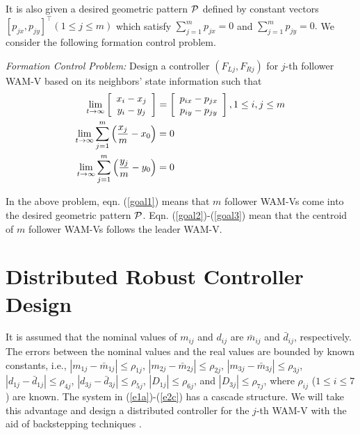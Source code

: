\documentclass[letterpaper, 10 pt, conference]{ieeeconf}  %
\begin{document}
It is also given a desired geometric pattern ${\cal P}$ defined by constant
vectors $[p_{jx},p_{jy}]^\top (1\leq j\leq m)$ which satisfy
$ \sum^m_{j=1}p_{jx}=0$ and $\sum^m_{j=1}p_{jy}=0.$
We consider the following formation control problem.


{\em Formation Control Problem:} Design a controller $(F_{Lj},F_{Rj})$ for $j$-th follower WAM-V
based on its neighbors' state information such that
\begin{eqnarray}
\lim_{t\rightarrow\infty}\left[\begin{array}{c} x_i-x_j\\
y_i-y_j\end{array}\right]=\left[\begin{array}{c}
p_{ix}-p_{jx}\\
p_{iy}-p_{jy}\end{array}\right], 1\leq i,j\leq m \label{goal1}\\
\lim_{t\rightarrow\infty}\sum^m_{j=1}\left(\frac{x_j}{m}-x_0\right)=0\makebox[4cm]{}\label{goal2}\\
\lim_{t\rightarrow\infty}\sum^m_{j=1}\left(\frac{y_j}{m}-y_0\right)=0\makebox[4cm]{}\label{goal3}
\end{eqnarray}


In the above problem, eqn. (\ref{goal1}) means that
$m$ follower WAM-Vs come into the desired geometric
pattern ${\cal P}$. Eqn. (\ref{goal2})-(\ref{goal3}) mean that the centroid of $m$ follower WAM-Vs follows the leader WAM-V.


\section{Distributed Robust Controller Design}
\label{sec4}

 It is assumed that the nominal values of $m_{ij}$ and $d_{ij}$ are $\bar{m}_{ij}$ and $\bar{d}_{ij}$, respectively. The errors between the nominal values and the real values are bounded by known constants, i.e.,
$|m_{1j}-\bar{m}_{1j}|\leq \rho_{1j}$, $|m_{2j}-\bar{m}_{2j}|\leq \rho_{2j}$, $|m_{3j}-\bar{m}_{3j}|\leq \rho_{3j}$,
$|d_{1j}-\bar{d}_{1j}|\leq \rho_{4j}$, $|d_{3j}-\bar{d}_{3j}|\leq \rho_{5j}$,  $\left|D_{1j}\right|\leq \rho_{6j}$, and
$\left|D_{3j}\right|\leq \rho_{7j}$, 
where $\rho_{ij}$ ($1\leq i\leq 7$) are known.
The system in (\ref{e1a})-(\ref{e2c}) has a cascade structure. We will take this advantage and design a  distributed controller for the $j$-th WAM-V with the aid of backstepping techniques \cite{krs95}. 
\end{document}
